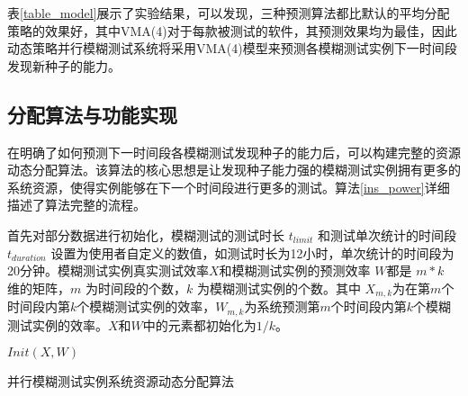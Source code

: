 \documentclass[master]{thesis-uestc}
\begin{document}
表\ref{table_model}展示了实验结果，可以发现，三种预测算法都比默认的平均分配策略的效果好，其中VMA(4)对于每款被测试的软件，其预测效果均为最佳，因此动态策略并行模糊测试系统将采用VMA(4)模型来预测各模糊测试实例下一时间段发现新种子的能力。

\subsection{分配算法与功能实现}

在明确了如何预测下一时间段各模糊测试发现种子的能力后，可以构建完整的资源动态分配算法。该算法的核心思想是让发现种子能力强的模糊测试实例拥有更多的系统资源，使得实例能够在下一个时间段进行更多的测试。算法\ref{ins_power}详细描述了算法完整的流程。

首先对部分数据进行初始化，模糊测试的测试时长 $t_{limit}$ 和测试单次统计的时间段$t_{duration}$ 设置为使用者自定义的数值，如测试时长为12小时，单次统计的时间段为20分钟。模糊测试实例真实测试效率$X$和模糊测试实例的预测效率 $W$都是 $m * k$ 维的矩阵，$m$ 为时间段的个数，$k$ 为模糊测试实例的个数。其中 $X_{m,k}$为在第$m$个时间段内第$k$个模糊测试实例的效率，$W_{m,k}$为系统预测第$m$个时间段内第$k$个模糊测试实例的效率。$X$和$W$中的元素都初始化为$1/k$。
\vspace{-20pt}
\begin{algorithm}[!t]
    $Init(X, W)$\;
    \caption{并行模糊测试实例系统资源动态分配算法}
    \label{ins_power}
\end{algorithm}
\end{document}
